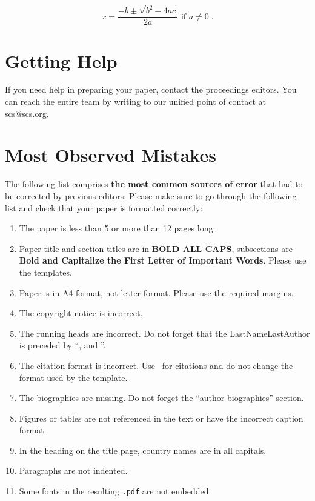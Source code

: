 \documentclass{scspaperproc}
\theoremstyle{scsthe}
\begin{document}
    \begin{equation} \label{eq:quadratic sol}
        x = \frac{-b \pm \sqrt{b^2-4ac}}{2a} \mbox{ if } a \ne 0\;.
    \end{equation}


    \section{Getting Help}
    If you need help in preparing your paper, contact the proceedings editors. You can reach the entire team by writing to our unified point of contact at \href{mailto://scs@scs.org}{scs@scs.org}.


    \section{Most Observed Mistakes}

    The following list comprises \textbf{the most common sources of error} that had to be corrected by previous editors. Please make sure to go through the following list and check that your paper is formatted correctly:
    \begin{enumerate}
        \item	The paper is less than 5 or more than 12 pages long.
        \item	Paper title and section titles are in \textbf{BOLD ALL CAPS}, subsections are \textbf{Bold and Capitalize the First Letter of Important Words}. Please use the templates.
        \item	Paper is in A4 format, not letter format. Please use the required margins.
        \item	The copyright notice is incorrect.
        \item	The running heads are incorrect. Do not forget that the LastNameLastAuthor is preceded by ``, and ''.
        \item	The citation format is incorrect. Use \BibTeX\ for citations and do not change the format used by the template.
        \item	The biographies are missing. Do not forget the ``author biographies'' section.
        \item	Figures or tables are not referenced in the text or have the incorrect caption format.
        \item In the heading on the title page, country names are in all capitals.
        \item	Paragraphs are not indented.
        \item Some fonts in the resulting \texttt{.pdf} are not embedded.
    \end{enumerate}
\end{document}

